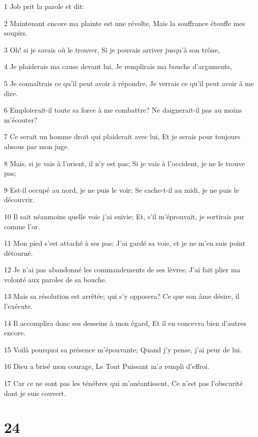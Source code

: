 \par 1 Job prit la parole et dit:
\par 2 Maintenant encore ma plainte est une révolte, Mais la souffrance étouffe mes soupirs.
\par 3 Oh! si je savais où le trouver, Si je pouvais arriver jusqu'à son trône,
\par 4 Je plaiderais ma cause devant lui, Je remplirais ma bouche d'arguments,
\par 5 Je connaîtrais ce qu'il peut avoir à répondre, Je verrais ce qu'il peut avoir à me dire.
\par 6 Emploierait-il toute sa force à me combattre? Ne daignerait-il pas au moins m'écouter?
\par 7 Ce serait un homme droit qui plaiderait avec lui, Et je serais pour toujours absous par mon juge.
\par 8 Mais, si je vais à l'orient, il n'y est pas; Si je vais à l'occident, je ne le trouve pas;
\par 9 Est-il occupé au nord, je ne puis le voir; Se cache-t-il au midi, je ne puis le découvrir.
\par 10 Il sait néanmoins quelle voie j'ai suivie; Et, s'il m'éprouvait, je sortirais pur comme l'or.
\par 11 Mon pied s'est attaché à ses pas; J'ai gardé sa voie, et je ne m'en suis point détourné.
\par 12 Je n'ai pas abandonné les commandements de ses lèvres; J'ai fait plier ma volonté aux paroles de sa bouche.
\par 13 Mais sa résolution est arrêtée; qui s'y opposera? Ce que son âme désire, il l'exécute.
\par 14 Il accomplira donc ses desseins à mon égard, Et il en concevra bien d'autres encore.
\par 15 Voilà pourquoi sa présence m'épouvante; Quand j'y pense, j'ai peur de lui.
\par 16 Dieu a brisé mon courage, Le Tout Puissant m'a rempli d'effroi.
\par 17 Car ce ne sont pas les ténèbres qui m'anéantissent, Ce n'est pas l'obscurité dont je suis couvert.

\chapter{24}

